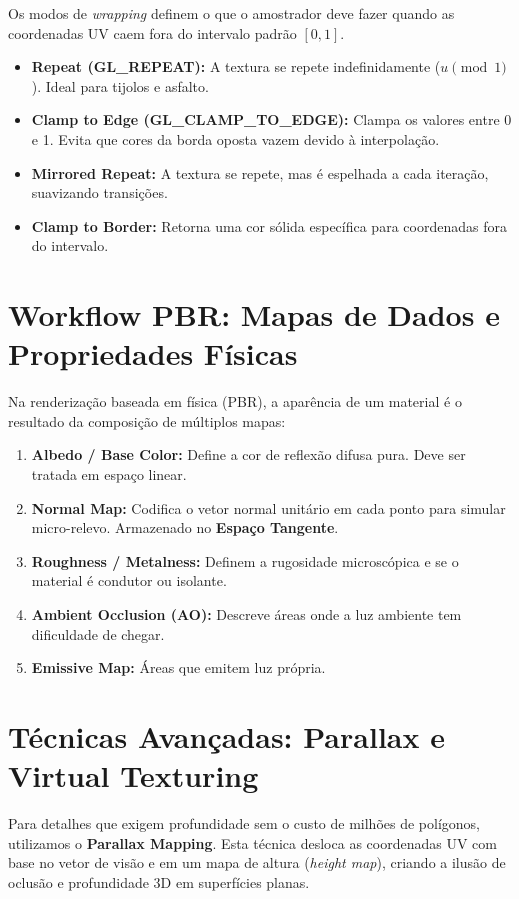 Os modos de \textit{wrapping} definem o que o amostrador deve fazer quando as coordenadas UV caem fora do intervalo padrão $[0, 1]$.

\begin{itemize}
    \item \textbf{Repeat (GL\_REPEAT):} A textura se repete indefinidamente ($u \pmod 1$). Ideal para tijolos e asfalto.
    \item \textbf{Clamp to Edge (GL\_CLAMP\_TO\_EDGE):} Clampa os valores entre 0 e 1. Evita que cores da borda oposta vazem devido à interpolação.
    \item \textbf{Mirrored Repeat:} A textura se repete, mas é espelhada a cada iteração, suavizando transições.
    \item \textbf{Clamp to Border:} Retorna uma cor sólida específica para coordenadas fora do intervalo.
\end{itemize}

\section{Workflow PBR: Mapas de Dados e Propriedades Físicas}

Na renderização baseada em física (PBR), a aparência de um material é o resultado da composição de múltiplos mapas:

\begin{enumerate}
    \item \textbf{Albedo / Base Color:} Define a cor de reflexão difusa pura. Deve ser tratada em espaço linear.
    \item \textbf{Normal Map:} Codifica o vetor normal unitário em cada ponto para simular micro-relevo. Armazenado no \textbf{Espaço Tangente}.
    \item \textbf{Roughness / Metalness:} Definem a rugosidade microscópica e se o material é condutor ou isolante.
    \item \textbf{Ambient Occlusion (AO):} Descreve áreas onde a luz ambiente tem dificuldade de chegar.
    \item \textbf{Emissive Map:} Áreas que emitem luz própria.
\end{enumerate}

\section{Técnicas Avançadas: Parallax e Virtual Texturing}

Para detalhes que exigem profundidade sem o custo de milhões de polígonos, utilizamos o \textbf{Parallax Mapping}. Esta técnica desloca as coordenadas UV com base no vetor de visão e em um mapa de altura (\textit{height map}), criando a ilusão de oclusão e profundidade 3D em superfícies planas.

